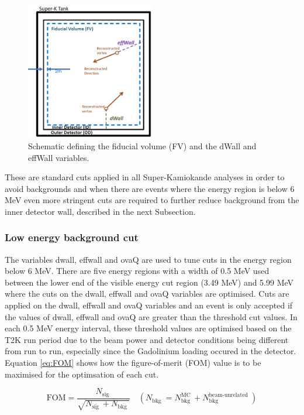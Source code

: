 \begin{figure}
    \centering 
    \includegraphics[width=0.5\textwidth]{Figures/fv_dwall_effwall.png}
    \caption{Schematic defining the fiducial volume (FV) and the dWall and effWall variables.}
    \label{fig:dwall_effwall_fv}
\end{figure} 
                                                                                        
These are standard cuts applied in all Super-Kamiokande analyses in order to avoid backgrounds and when there are events where the energy region is below 6 MeV even more stringent cuts are required to further reduce background from the inner detector wall, described in the next Subsection. 

\subsubsection{Low energy background cut}

The variables dwall, effwall and ovaQ are used to tune cuts in the energy region below 6 MeV. There are five energy regions with a width of 0.5 MeV used between the lower end of the visible energy cut region (3.49 MeV) and 5.99 MeV where the cuts on the dwall, effwall and ovaQ variables are optimised. Cuts are applied on the dwall, effwall and ovaQ variables and an event is only accepted if the values of dwall, effwall and ovaQ are greater than the threshold cut values. In each 0.5 MeV energy interval, these threshold values are optimised based on the T2K run period due to the beam power and detector conditions being different from run to run, especially since the Gadolinium loading occured in the detector. Equation \ref{eq:FOM} shows how the figure-of-merit (FOM) value is to be maximised for the optimsation of each cut.

\begin{equation}
    \mathrm{FOM}=\frac{N_{\text {sig }}}{\sqrt{N_{\text {sig }}+N_{\text {bkg }}}} \quad\left(N_{\text {bkg }}=N_{\text {bkg }}^{\mathrm{MC}}+N_{\text {bkg }}^{\text {beam-unrelated }}\right)
\label{eq:FOM}
\end{equation}

